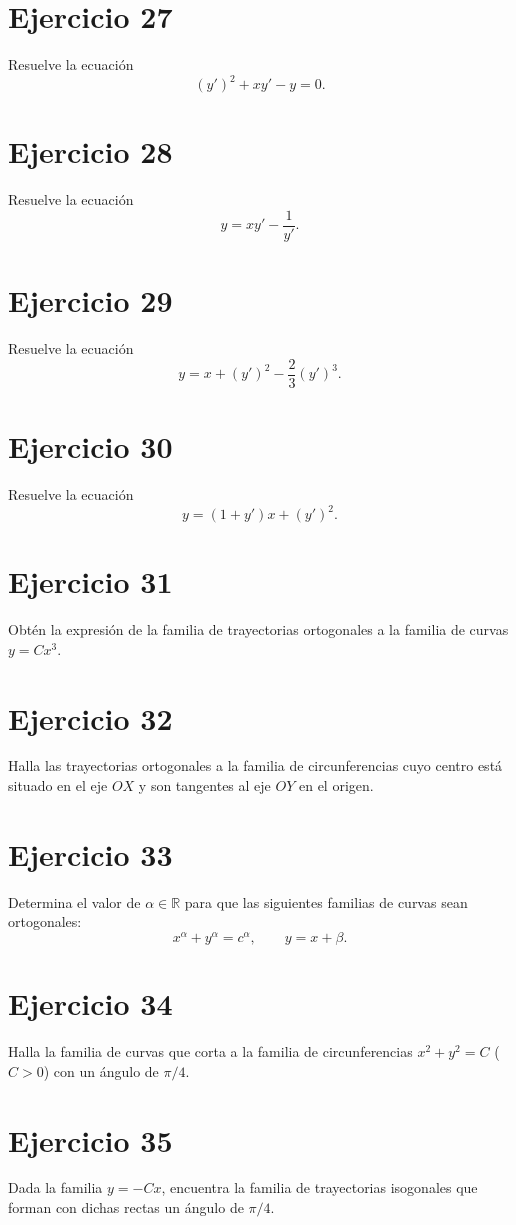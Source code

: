 \documentclass[12pt]{article}
\begin{document}
\section*{Ejercicio 27}
Resuelve la ecuación
\[
(y')^2 + x y' - y = 0.
\]

\section*{Ejercicio 28}
Resuelve la ecuación
\[
y = x y' - \dfrac{1}{y'}.
\]

\section*{Ejercicio 29}
Resuelve la ecuación
\[
y = x + (y')^2 - \dfrac{2}{3}(y')^3.
\]

\section*{Ejercicio 30}
Resuelve la ecuación
\[
y = (1 + y')x + (y')^2.
\]

\section*{Ejercicio 31}
Obtén la expresión de la familia de trayectorias ortogonales a la familia de curvas $y = Cx^3$.

\section*{Ejercicio 32}
Halla las trayectorias ortogonales a la familia de circunferencias cuyo centro está situado en el eje $OX$ y son tangentes al eje $OY$ en el origen.

\section*{Ejercicio 33}
Determina el valor de $\alpha \in \mathbb{R}$ para que las siguientes familias de curvas sean ortogonales:
\[
x^\alpha + y^\alpha = c^\alpha, 
\qquad
y = x + \beta.
\]

\section*{Ejercicio 34}
Halla la familia de curvas que corta a la familia de circunferencias $x^2 + y^2 = C$ ($C > 0$) con un ángulo de $\pi/4$.

\section*{Ejercicio 35}
Dada la familia $y = -Cx$, encuentra la familia de trayectorias isogonales que forman con dichas rectas un ángulo de $\pi/4$.
\end{document}
